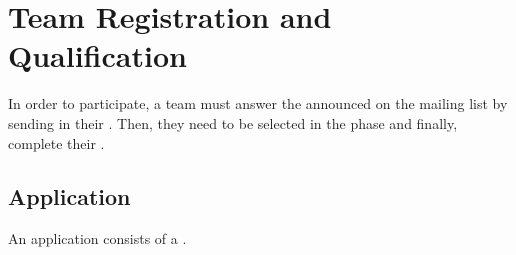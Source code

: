 \section{Team Registration and Qualification}
\label{sec:rules:particpation}

In order to participate, a team must answer the \CFP{} announced on the \AtHome{} mailing list by sending in their \Application{}. Then, they need to be selected in the \Qualification{} phase and finally, complete their \Registration{}.


\subsection{Application}
\label{sec:rules:application}

An application consists of a 
\TDP{}.





